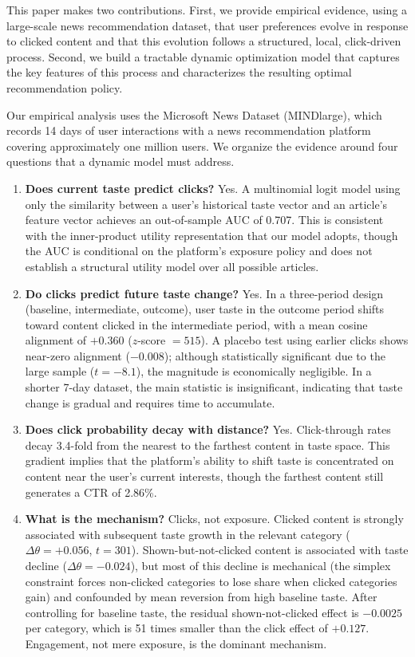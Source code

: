 \documentclass[11pt]{article}
\begin{document}
This paper makes two contributions. First, we provide empirical evidence, using a large-scale news recommendation dataset, that user preferences evolve in response to clicked content and that this evolution follows a structured, local, click-driven process. Second, we build a tractable dynamic optimization model that captures the key features of this process and characterizes the resulting optimal recommendation policy.

Our empirical analysis uses the Microsoft News Dataset (MINDlarge), which records 14 days of user interactions with a news recommendation platform covering approximately one million users. We organize the evidence around four questions that a dynamic model must address.

\begin{enumerate}[leftmargin=2em, itemsep=0.3em]
\item \textbf{Does current taste predict clicks?} Yes. A multinomial logit model using only the similarity between a user's historical taste vector and an article's feature vector achieves an out-of-sample AUC of 0.707. This is consistent with the inner-product utility representation that our model adopts, though the AUC is conditional on the platform's exposure policy and does not establish a structural utility model over all possible articles.

\item \textbf{Do clicks predict future taste change?} Yes. In a three-period design (baseline, intermediate, outcome), user taste in the outcome period shifts toward content clicked in the intermediate period, with a mean cosine alignment of $+0.360$ ($z$-score $= 515$). A placebo test using earlier clicks shows near-zero alignment ($-0.008$); although statistically significant due to the large sample ($t = -8.1$), the magnitude is economically negligible. In a shorter 7-day dataset, the main statistic is insignificant, indicating that taste change is gradual and requires time to accumulate.

\item \textbf{Does click probability decay with distance?} Yes. Click-through rates decay 3.4-fold from the nearest to the farthest content in taste space. This gradient implies that the platform's ability to shift taste is concentrated on content near the user's current interests, though the farthest content still generates a CTR of 2.86\%.

\item \textbf{What is the mechanism?} Clicks, not exposure. Clicked content is strongly associated with subsequent taste growth in the relevant category ($\Delta\theta = +0.056$, $t = 301$). Shown-but-not-clicked content is associated with taste decline ($\Delta\theta = -0.024$), but most of this decline is mechanical (the simplex constraint forces non-clicked categories to lose share when clicked categories gain) and confounded by mean reversion from high baseline taste. After controlling for baseline taste, the residual shown-not-clicked effect is $-0.0025$ per category, which is 51 times smaller than the click effect of $+0.127$. Engagement, not mere exposure, is the dominant mechanism.
\end{enumerate}
\end{document}
